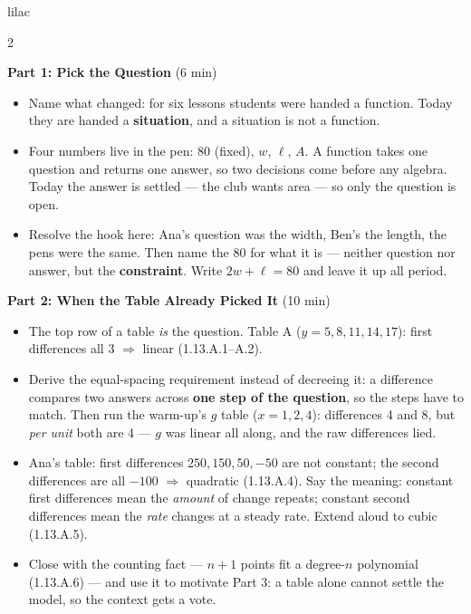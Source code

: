 \documentclass[10pt]{article}
\begin{document}
\begin{skillbox}[Lesson]{lilac}
\begin{multicols}{2}

\textbf{Part 1: Pick the Question} (6 min)

\begin{itemize}
  \item Name what changed: for six lessons students were handed a function.
        Today they are handed a \textbf{situation}, and a situation is not a
        function.
  \item Four numbers live in the pen: 80 (fixed), $w$, $\ell$, $A$. A function
        takes one question and returns one answer, so two decisions come before
        any algebra. Today the answer is settled --- the club wants area --- so
        only the question is open.
  \item Resolve the hook here: Ana's question was the width, Ben's the length,
        the pens were the same. Then name the 80 for what it is --- neither
        question nor answer, but the \textbf{constraint}. Write
        $2w + \ell = 80$ and leave it up all period.
\end{itemize}

\textbf{Part 2: When the Table Already Picked It} (10 min)

\begin{itemize}
  \item The top row of a table \textit{is} the question. Table A
        ($y = 5,8,11,14,17$): first differences all 3 $\Rightarrow$ linear
        (1.13.A.1--A.2).
  \item Derive the equal-spacing requirement instead of decreeing it: a
        difference compares two answers across \textbf{one step of the
        question}, so the steps have to match. Then run the warm-up's $g$ table
        ($x = 1, 2, 4$): differences 4 and 8, but \textit{per unit} both are 4
        --- $g$ was linear all along, and the raw differences lied.
  \item Ana's table: first differences $250, 150, 50, -50$ are not constant;
        the second differences are all $-100$ $\Rightarrow$ quadratic
        (1.13.A.4). Say the meaning: constant first differences mean the
        \textit{amount} of change repeats; constant second differences mean the
        \textit{rate} changes at a steady rate. Extend aloud to cubic
        (1.13.A.5).
  \item Close with the counting fact --- $n+1$ points fit a degree-$n$
        polynomial (1.13.A.6) --- and use it to motivate Part 3: a table alone
        cannot settle the model, so the context gets a vote.
\end{itemize}


\end{multicols}
\end{skillbox}
\end{document}
